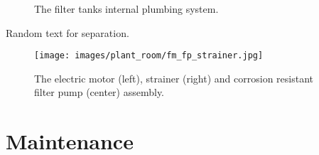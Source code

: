 \documentclass[
  letterpaper,
  DIV=11,
  numbers=noendperiod]{scrreprt}
\begin{document}
\begin{figure}[H]

\begin{minipage}[t]{0.33\linewidth}

{\centering 


}

\end{minipage}%
%
\begin{minipage}[t]{0.33\linewidth}

{\centering 


}

\end{minipage}%
%
\begin{minipage}[t]{0.33\linewidth}

{\centering 


}

\end{minipage}%

\caption{\label{fig-filter-plumbing}The filter tanks internal plumbing
system.}

\end{figure}

Random text for separation.

\begin{figure}[H]

{\centering \texttt{[image: images/plant\_room/fm\_fp\_strainer.jpg]}

}

\caption{\label{fig-filter-pumps}The electric motor (left), strainer
(right) and corrosion resistant filter pump (center) assembly.}

\end{figure}

\hypertarget{maintenance}{%
\section{Maintenance}\label{maintenance}}
\end{document}
